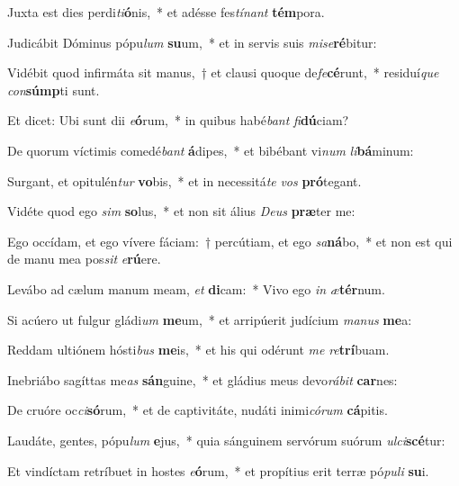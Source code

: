 \item Juxta est dies perdi\textit{ti}\textbf{ó}nis,~* et adésse fes\textit{tí}\textit{nant} \textbf{tém}pora.
\item Judicábit Dóminus pópu\textit{lum} \textbf{su}um,~* et in servis suis \textit{mi}\textit{se}\textbf{ré}bitur:
\item Vidébit quod infirmáta sit manus,~† et clausi quoque de\textit{fe}\textbf{cé}runt,~* residuí\textit{que} \textit{con}\textbf{súmp}ti sunt.
\item Et dicet: Ubi sunt dii \textit{e}\textbf{ó}rum,~* in quibus habé\textit{bant} \textit{fi}\textbf{dú}ciam?
\item De quorum víctimis comedé\textit{bant} \textbf{á}dipes,~* et bibébant vi\textit{num} \textit{li}\textbf{bá}minum:
\item Surgant, et opitulén\textit{tur} \textbf{vo}bis,~* et in necessitá\textit{te} \textit{vos} \textbf{pró}tegant.
\item Vidéte quod ego \textit{sim} \textbf{so}lus,~* et non sit álius \textit{De}\textit{us} \textbf{præ}ter me:
\item Ego occídam, et ego vívere fáciam:~† percútiam, et ego \textit{sa}\textbf{ná}bo,~* et non est qui de manu mea pos\textit{sit} \textit{e}\textbf{rú}ere.
\item Levábo ad cælum manum meam, \textit{et} \textbf{di}cam:~* Vivo ego \textit{in} \textit{æ}\textbf{tér}num.
\item Si acúero ut fulgur gládi\textit{um} \textbf{me}um,~* et arripúerit judícium \textit{ma}\textit{nus} \textbf{me}a:
\item Reddam ultiónem hósti\textit{bus} \textbf{me}is,~* et his qui odérunt \textit{me} \textit{re}\textbf{trí}buam.
\item Inebriábo sagíttas me\textit{as} \textbf{sán}guine,~* et gládius meus devo\textit{rá}\textit{bit} \textbf{car}nes:
\item De cruóre oc\textit{ci}\textbf{só}rum,~* et de captivitáte, nudáti inimi\textit{có}\textit{rum} \textbf{cá}pitis.
\item Laudáte, gentes, pópu\textit{lum} \textbf{e}jus,~* quia sánguinem servórum suórum \textit{ul}\textit{ci}\textbf{scé}tur:
\item Et vindíctam retríbuet in hostes \textit{e}\textbf{ó}rum,~* et propítius erit terræ pó\textit{pu}\textit{li} \textbf{su}i.
